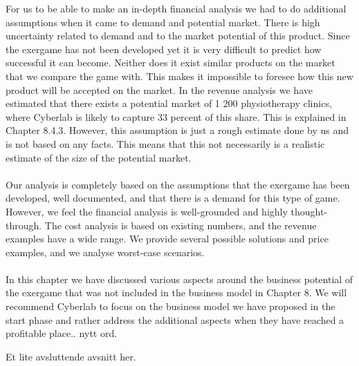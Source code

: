 For us to be able to make an in-depth financial analysis we had to do additional assumptions when it came to demand and potential market. There is high uncertainty related to demand and to the market potential of this product. Since the exergame has not been developed yet it is very difficult to predict how successful it can become. Neither does it exist similar products on the market that we compare the game with. This makes it impossible to foresee how this new product will be accepted on the market. In the revenue analysis we have estimated that there exists a potential market of 1 200 physiotherapy clinics, where Cyberlab is likely to capture 33 percent of this share. This is explained in Chapter 8.4.3. However, this assumption is just a rough estimate done by us and is not based on any facts. This means that this not necessarily is a realistic estimate of the size of the potential market. \\ \\
Our analysis is completely based on the assumptions that the exergame has been developed, well documented, and that there is a demand for this type of game.  However, we feel the financial analysis is well-grounded and highly thought-through. The cost analysis is based on existing numbers, and the revenue examples have a wide range. We provide several possible solutions and price examples, and we analyse worst-case scenarios.  \\ \\
In this chapter we have discussed various aspects around the business potential of the exergame that was not included in the business model in Chapter 8. We will recommend Cyberlab to focus on the business model we have proposed in the start phase and rather address the additional aspects when they have reached a profitable place.. nytt ord.

Et lite avsluttende avsnitt her.


